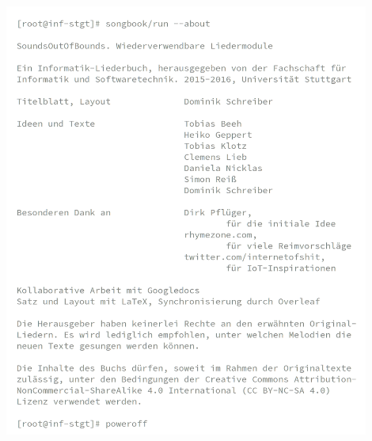 \documentclass[11pt,a5paper]{article}
\begin{document}
\pagebreak

\vspace*{3.5cm}

\hfill\includegraphics[width=12cm]{hacker-cover-hinten-zugeschnitten.png}\hspace*{\fill}

\thispagestyle{empty}




\end{document}
